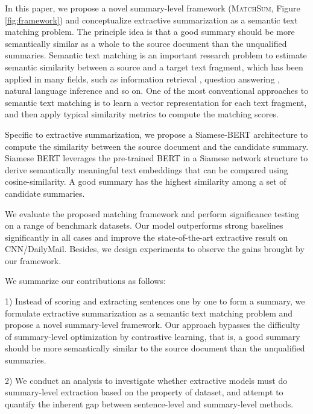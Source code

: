 In this paper, we propose a novel summary-level framework (\textsc{MatchSum}, Figure \ref{fig:framework}) and conceptualize extractive summarization as a semantic text matching problem. The principle idea is that a good summary should be more semantically similar as a whole to the source document than the unqualified summaries.
Semantic text matching is an important research problem to estimate semantic similarity between a source and a target text fragment, which has been applied in many fields, such as information retrieval \cite{mitra2017learning}, question answering \cite{yih2013question, severyn2015learning}, natural language inference \cite{wang2016learning, wang2017bilateral} and so on. One of the most conventional approaches to semantic text matching is to learn a vector representation for each text fragment, and then apply typical similarity metrics to compute the matching scores.

Specific to extractive summarization, we propose a Siamese-BERT architecture to compute the similarity between the source document and the candidate summary. Siamese BERT leverages the pre-trained
BERT \cite{devlin2019bert} in a Siamese network structure \cite{bromley1994signature, hoffer2015deep, reimers2019sentence} to derive semantically meaningful text embeddings that can be compared using cosine-similarity.
A good summary has the highest similarity among a set of candidate summaries.

We evaluate the proposed matching framework and perform significance testing on a range of benchmark datasets. Our model outperforms strong baselines significantly in all cases and improve the state-of-the-art extractive result on CNN/DailyMail. Besides, we design experiments to observe the gains brought by our framework.

We summarize our contributions as follows:

1) Instead of scoring and extracting sentences one by one to form a summary, we formulate extractive summarization as a semantic text matching problem and propose a novel summary-level framework. Our approach bypasses the difficulty of summary-level optimization by contrastive learning, that is, a good summary  should  be  more  semantically  similar to the source document than the unqualified summaries.

2) We conduct an analysis to investigate whether extractive models must do summary-level extraction based on the property of dataset, and attempt to quantify the inherent gap between sentence-level and summary-level methods.

